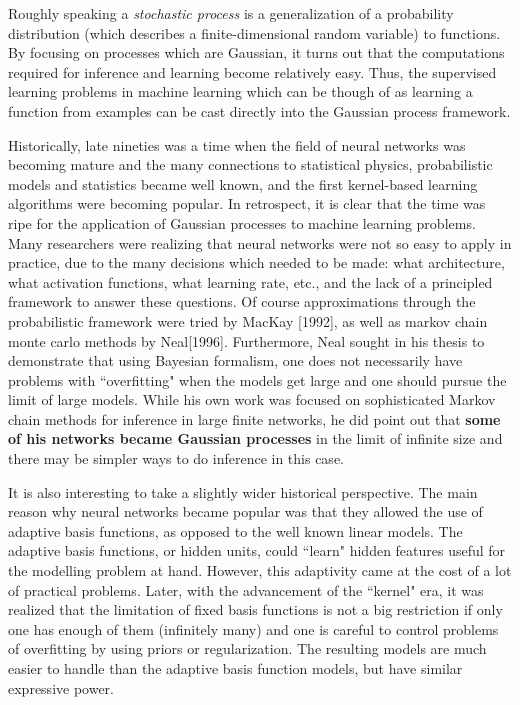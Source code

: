 \documentclass[12pt,a4paper,oneside]{book}
\theoremstyle{plain}
\theoremstyle{definition}
\begin{document}
{\vspace{3mm}
\noindent
Roughly speaking a \textit{stochastic process} is a generalization of a probability distribution (which describes a finite-dimensional random variable) to functions. By focusing on processes which are Gaussian, it turns out that the computations required for inference and learning become relatively easy. Thus, the supervised learning problems in machine learning which can be though of as learning a function from examples can be cast directly into the Gaussian process framework. 

\vspace{3mm}
\noindent
Historically, late nineties was a time when the field of neural networks was becoming mature and the many connections to statistical physics, probabilistic models and statistics became well known, and the first kernel-based learning algorithms were becoming popular. In retrospect, it is clear that the time was ripe for the application of Gaussian processes to machine learning problems. Many researchers were realizing that neural networks were not so easy to apply in practice, due to the many decisions which needed to be made: what architecture, what activation functions, what learning rate, etc., and the lack of a principled framework to answer these questions. Of course approximations through the probabilistic framework were tried by MacKay [1992], as well as markov chain monte carlo methods by Neal[1996]. Furthermore, Neal sought in his thesis to demonstrate that using Bayesian formalism, one does not necessarily have problems with ``overfitting" when the models get large and one should pursue the limit of large models. While his own work was focused on sophisticated Markov chain methods for inference in large finite networks, he did point out that \textbf{some of his networks became Gaussian processes} in the limit of infinite size and there may be simpler ways to do inference in this case.

\vspace{3mm}\noindent
It is also interesting to take a slightly wider historical perspective. The main reason why neural networks became popular was that they allowed the use of adaptive basis functions, as opposed to the well known linear models. The adaptive basis functions, or hidden units, could ``learn" hidden features useful for the modelling problem at hand. However, this adaptivity came at the cost of a lot of practical problems. Later, with the advancement of the ``kernel" era, it was realized that the limitation of fixed basis functions is not a big restriction if only one has enough of them (infinitely many) and one is careful to control problems of overfitting by using priors or regularization. The resulting models are much easier to handle than the adaptive basis function models, but have similar expressive power. 

}
\end{document}

